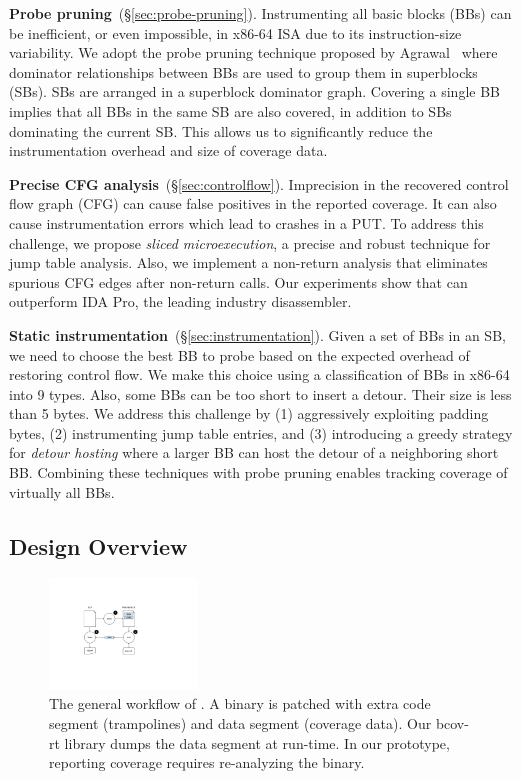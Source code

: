 \textbf{Probe pruning}~(\S\ref{sec:probe-pruning}). 
Instrumenting all basic blocks (BBs) can be inefficient, or even impossible, in x86-64 ISA due to its instruction-size variability.
We adopt the probe pruning technique proposed by Agrawal~\cite{Agrawal1994} where dominator relationships between BBs are used to group them in superblocks (SBs).
SBs are  arranged in a superblock dominator graph.
Covering a single BB implies that all BBs in the same SB are also covered, in addition to SBs dominating the current SB.
This allows us to significantly reduce the instrumentation overhead and size of coverage data.

\textbf{Precise CFG analysis}~(\S\ref{sec:controlflow}). 
Imprecision in the recovered control flow graph (CFG) can cause false positives in the reported coverage. 
It can also cause instrumentation errors which lead to crashes in a PUT.
To address this challenge, we propose \textit{sliced microexecution}, a precise and robust technique for jump table analysis. 
Also, we implement a non-return analysis that eliminates spurious CFG edges after non-return calls.
Our experiments show that {\bcov} can outperform IDA Pro, the leading industry disassembler.

\textbf{Static instrumentation}~(\S\ref{sec:instrumentation}). 
Given a set of BBs in an SB, we need to choose the best BB to probe based on the expected overhead of restoring control flow. 
We make this choice using a classification of BBs in \mbox{x86-64} into 9 types.
Also, some BBs can be too short to insert a detour. Their size is less than 5 bytes. 
We address this challenge by (1) aggressively exploiting padding bytes, (2) instrumenting jump table entries, and (3) introducing a greedy strategy for \textit{detour hosting} where a larger BB can host the detour of a neighboring short BB.
Combining these techniques with probe pruning enables tracking coverage of virtually all BBs.

\subsection{Design Overview}

\begin{figure}[t!]
    \centering
    \includegraphics[clip, trim=5cm 5.8cm 10cm 4.8cm, width=0.35\textwidth]{fig/bcov-01-work-flow}
    \caption[workflow]{The general workflow of {\bcov}. 
        A binary is patched with extra code segment (trampolines) and data segment (coverage data). 
        Our \mbox{\textsf{bcov-rt}} library dumps the data segment at run-time. 
        In our prototype, reporting coverage requires re-analyzing the binary.}
    \label{fig:bcov-work-flow}
\end{figure}

